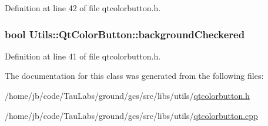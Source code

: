 \-Definition at line 42 of file qtcolorbutton.\-h.

\hypertarget{class_utils_1_1_qt_color_button_a4610a035893dd4f90c4ce55ac5a91592}{
\subsubsection[{background\-Checkered}]{\setlength{\rightskip}{0pt plus 5cm}bool {\bf \-Utils\-::\-Qt\-Color\-Button\-::background\-Checkered}}}\label{class_utils_1_1_qt_color_button_a4610a035893dd4f90c4ce55ac5a91592}


\-Definition at line 41 of file qtcolorbutton.\-h.



\-The documentation for this class was generated from the following files\-:\begin{DoxyCompactItemize}
\item 
/home/jb/code/\-Tau\-Labs/ground/gcs/src/libs/utils/\hyperlink{qtcolorbutton_8h}{qtcolorbutton.\-h}\item 
/home/jb/code/\-Tau\-Labs/ground/gcs/src/libs/utils/\hyperlink{qtcolorbutton_8cpp}{qtcolorbutton.\-cpp}\end{DoxyCompactItemize}
